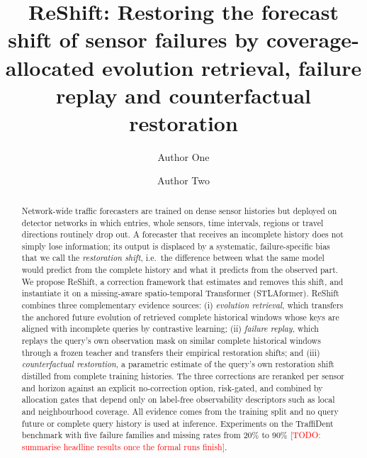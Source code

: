 \documentclass[preprint,12pt,authoryear]{elsarticle}
\newcommand{\todo}[1]{\textcolor{red}{[TODO: #1]}}
\begin{document}
\begin{frontmatter}

\title{ReShift: Restoring the forecast shift of sensor failures by coverage-allocated evolution retrieval, failure replay and counterfactual restoration}

\author[aff1]{Author One}
\author[aff1]{Author Two}

\begin{abstract}
Network-wide traffic forecasters are trained on dense sensor histories but deployed on detector networks in which entries, whole sensors, time intervals, regions or travel directions routinely drop out. A forecaster that receives an incomplete history does not simply lose information; its output is displaced by a systematic, failure-specific bias that we call the \emph{restoration shift}, i.e.\ the difference between what the same model would predict from the complete history and what it predicts from the observed part. We propose ReShift, a correction framework that estimates and removes this shift, and instantiate it on a missing-aware spatio-temporal Transformer (STLAformer). ReShift combines three complementary evidence sources: (i) \emph{evolution retrieval}, which transfers the anchored future evolution of retrieved complete historical windows whose keys are aligned with incomplete queries by contrastive learning; (ii) \emph{failure replay}, which replays the query's own observation mask on similar complete historical windows through a frozen teacher and transfers their empirical restoration shifts; and (iii) \emph{counterfactual restoration}, a parametric estimate of the query's own restoration shift distilled from complete training histories. The three corrections are reranked per sensor and horizon against an explicit no-correction option, risk-gated, and combined by allocation gates that depend only on label-free observability descriptors such as local and neighbourhood coverage. All evidence comes from the training split and no query future or complete query history is used at inference. Experiments on the TraffiDent benchmark with five failure families and missing rates from 20\% to 90\% \todo{summarise headline results once the formal runs finish}.
\end{abstract}


\end{frontmatter}
\end{document}
